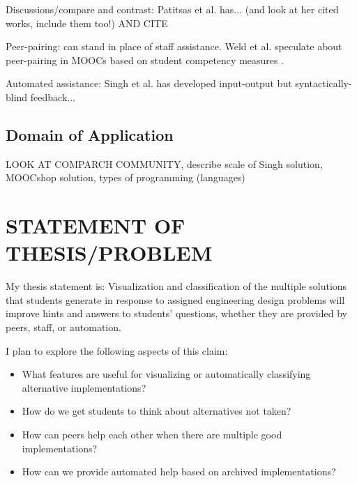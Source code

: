 \documentclass[12pt]{article}
\begin{document}
Discussions/compare and contrast: Patitsas et al. \cite{PatitsasICER13} has... (and look at her cited works, include them too!) AND CITE \cite{peerReview98}

Peer-pairing: can stand in place of staff assistance. Weld et al. speculate about peer-pairing in MOOCs based on student competency measures \cite{WeldHcomp12}.

Automated assistance: Singh et al. \cite{rishabh} has developed input-output but syntactically-blind feedback...

\subsection{Domain of Application}

LOOK AT COMPARCH COMMUNITY, describe scale of Singh solution, MOOCshop solution, types of programming (languages)

\section{STATEMENT OF THESIS/PROBLEM}

My thesis statement is: Visualization and classification of the multiple solutions that students generate in response to assigned engineering design problems will improve hints and answers to students' questions, whether they are provided by peers, staff, or automation. 

I plan to explore the following aspects of this claim:
\begin{itemize}

\item What features are useful for visualizing or automatically classifying alternative implementations?

\item How do we get students to think about alternatives not taken?

\item How can peers help each other when there are multiple good implementations?

\item How can we provide automated help based on archived implementations?

\end{itemize}
\end{document}
